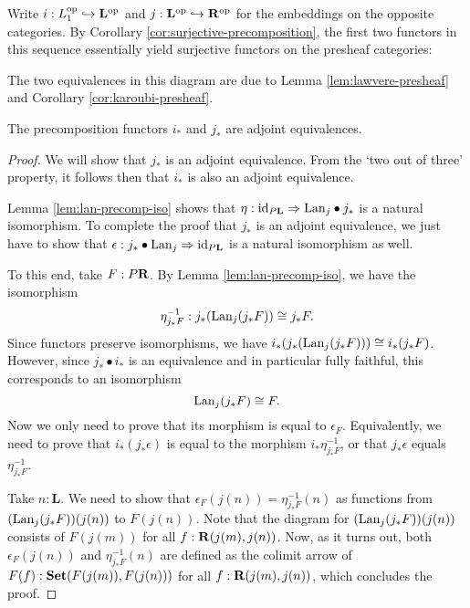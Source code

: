 Write $ i: L_1^{\text{op}} \hookrightarrow \mathbf L^{\text{op}} $ and $ j: \mathbf L^{\text{op}} \hookrightarrow \mathbf{R}^{\text{op}} $ for the embeddings on the opposite categories. By Corollary \ref{cor:surjective-precomposition}, the first two functors in this sequence essentially yield surjective functors on the presheaf categories:
\begin{center}
\end{center}
The two equivalences in this diagram are due to Lemma \ref{lem:lawvere-presheaf} and Corollary \ref{cor:karoubi-presheaf}.

\begin{lemma}\label{lem:equivalent-presheaf-cats}
  The precomposition functors $ i_* $ and $ j_* $ are adjoint equivalences.
\end{lemma}
\begin{proof}
  We will show that $ j_* $ is an adjoint equivalence. From the `two out of three' property, it follows then that $ i_* $ is also an adjoint equivalence.

  Lemma \ref{lem:lan-precomp-iso} shows that $ \eta: \text{id}_{P \mathbf L} \Rightarrow \text{Lan}_{j} \bullet j_* $ is a natural isomorphism. To complete the proof that $ j_* $ is an adjoint equivalence, we just have to show that $ \epsilon: j_* \bullet \text{Lan}_{j} \Rightarrow \text{id}_{P \mathbf L} $ is a natural isomorphism as well.

  To this end, take $ F : P \mathbf{R} $. By Lemma \ref{lem:lan-precomp-iso}, we have the isomorphism
  \[ \eta^{-1}_{j_* F}: j_* (\text{Lan}_{j}(j_* F)) \cong j_* F. \]
  Since functors preserve isomorphisms, we have $ i_* (j_* (\text{Lan}_{j}(j_* F))) \cong i_* (j_* F) $. However, since $ j_* \bullet i_* $ is an equivalence and in particular fully faithful, this corresponds to an isomorphism
  \[ \text{Lan}_{j}(j_* F) \cong F. \]
  Now we only need to prove that its morphism is equal to $ \epsilon_F $. Equivalently, we need to prove that $ i_* (j_* \epsilon) $ is equal to the morphism $ i_* \eta_{j_* F}^{-1} $, or that $ j_* \epsilon $ equals $ \eta^{-1}_{j_* F} $.

  Take $ n : \mathbf L $. We need to show that $ \epsilon_F (j(n)) = \eta_{j_* F}^{-1}(n) $ as functions from $ (\text{Lan}_{j} (j_* F)) (j(n)) $ to $ F(j(n)) $. Note that the diagram for $ (\text{Lan}_{j} (j_* F)) (j(n)) $ consists of $ F(j(m)) $ for all $ f: \mathbf{R}(j(m), j(n)) $. Now, as it turns out, both $ \epsilon_F (j(n)) $ and $ \eta_{j_* F}^{-1}(n) $ are defined as the colimit arrow of $ F(f) : \mathbf{Set}(F(j(m)), F(j(n))) $ for all $ f: \mathbf{R}(j(m), j(n)) $, which concludes the proof.
\end{proof}

